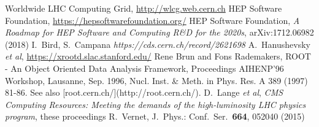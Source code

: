 \begin{thebibliography}{}
Worldwide LHC Computing Grid, \url{http://wlcg.web.cern.ch}
HEP Software Foundation, \url{https://hepsoftwarefoundation.org/}
HEP Software Foundation, \textit{A Roadmap for HEP Software and Computing R\&D for the 2020s}, arXiv:1712.06982 (2018)
I.~Bird, S.~Campana \textit{https://cds.cern.ch/record/2621698}
A.~Hanushevsky {\em et al}, \url{https://xrootd.slac.stanford.edu/}
Rene Brun and Fons Rademakers, ROOT - An Object Oriented Data Analysis Framework,
Proceedings AIHENP'96 Workshop, Lausanne, Sep. 1996, Nucl. Inst. & Meth. in Phys. Res. A 389 (1997) 81-86. See also [root.cern.ch/](http://root.cern.ch/).
D.~Lange {\em et al}, \textit{CMS Computing Resources: Meeting the demands of the high-luminosity LHC physics program}, these proceedings
R.~Vernet, J.\ Phys.: Conf.\ Ser.\ \textbf{664}, 052040 (2015)
\end{thebibliography}
